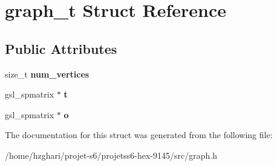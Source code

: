 \hypertarget{structgraph__t}{}\section{graph\+\_\+t Struct Reference}
\label{structgraph__t}
\subsection*{Public Attributes}
\begin{DoxyCompactItemize}
\item 
\mbox{\label{structgraph__t_a96fc395f8058e79976b30ef65dc45451}} 
size\+\_\+t {\bfseries num\+\_\+vertices}
\item 
\mbox{\label{structgraph__t_a1dc922c0965ced559eb1f7a480dd07f4}} 
gsl\+\_\+spmatrix $\ast$ {\bfseries t}
\item 
\mbox{\label{structgraph__t_ad9dd0592ff4e287195dbfc12409ec3b5}} 
gsl\+\_\+spmatrix $\ast$ {\bfseries o}
\end{DoxyCompactItemize}


The documentation for this struct was generated from the following file\+:\begin{DoxyCompactItemize}
\item 
/home/hzghari/projet-\/s6/projetss6-\/hex-\/9145/src/graph.\+h\end{DoxyCompactItemize}
